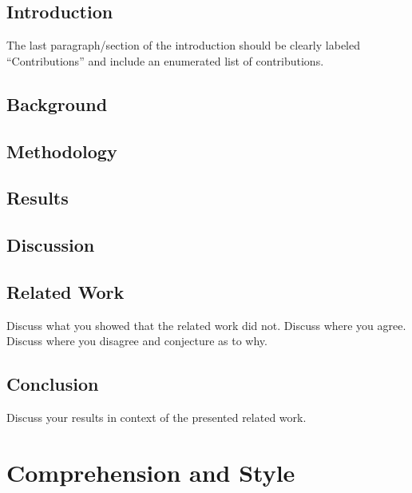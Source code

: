 \subsection{Introduction}

  The last paragraph/section of the introduction should be clearly labeled ``Contributions'' and
  include an enumerated list of contributions.

\subsection{Background}

\subsection{Methodology}

\subsection{Results}

\subsection{Discussion}

\subsection{Related Work}

  Discuss what you showed that the related work did not. Discuss where you agree. Discuss where you
  disagree and conjecture as to why.

\subsection{Conclusion}

 Discuss your results in context of the presented related work.


\section{Comprehension and Style}

